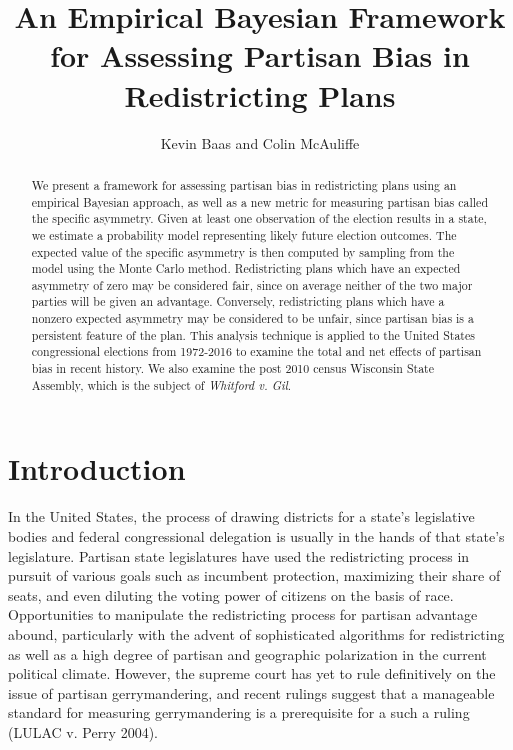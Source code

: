 \documentclass[preprint,12pt]{article}
\begin{document}
\title{An Empirical Bayesian Framework for Assessing Partisan Bias in Redistricting Plans}

\author{Kevin Baas and Colin McAuliffe}

\maketitle

\begin{abstract}
We present a framework for assessing partisan bias in redistricting plans using an empirical Bayesian approach, as well as a new metric for measuring partisan bias called the specific asymmetry.
Given at least one observation of the election results in a state, we estimate a probability model representing likely future election outcomes.
The expected value of the specific asymmetry is then computed by sampling from the model using the Monte Carlo method.
Redistricting plans which have an expected asymmetry of zero may be considered fair, since on average neither of the two major parties will be given an advantage.
Conversely, redistricting plans which have a nonzero expected asymmetry may be considered to be unfair, since partisan bias is a persistent feature of the plan.
This analysis technique is applied to the United States congressional elections from 1972-2016 to examine the total and net effects of partisan bias in recent history.
We also examine the post 2010 census Wisconsin State Assembly, which is the subject of \emph{Whitford v. Gil}.

\end{abstract}

\section{Introduction}
In the United States, the process of drawing districts for a state's legislative bodies and federal congressional delegation is usually in the hands of that state's legislature.
Partisan state legislatures have used the redistricting process in pursuit of various goals such as incumbent protection, maximizing their share of seats, and even diluting the voting power of citizens on the basis of race.
Opportunities to manipulate the redistricting process for partisan advantage abound, particularly with the advent of sophisticated algorithms for redistricting as well as a high degree of partisan and geographic polarization in the current political climate.
However, the supreme court has yet to rule definitively on the issue of partisan gerrymandering, and recent rulings suggest that a manageable standard for measuring gerrymandering is a prerequisite for a such a ruling (LULAC v. Perry 2004).
\end{document}
